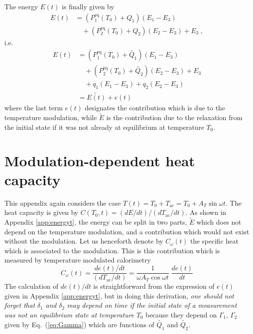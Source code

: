 \documentclass[pre,a4paper,twocolumn,superscriptaddress,%
floatfix]{revtex4}
\newcommand{\tac}{\ensuremath{T_{\mathrm{ac}}}}
\begin{document}
The energy $E(t)$ is finally given by
\begin{align}
  \label{eq:solutionEt}
  E(t) &= (P_1^{\mathrm{eq}}(T_0) + Q_1)(E_1 - E_3) \nonumber \\ & \quad +
  (P_2^{\mathrm{eq}}(T_0) + Q_2)(E_2 - E_3) + E_3 \; ,
\end{align}
i.e.
\begin{align}
  \label{eq:solutionEe}
  E(t) &= (P_1^{\mathrm{eq}}(T_0) + \widetilde{Q_1})(E_1 - E_3)
         \nonumber \\ & \quad
      +(P_2^{\mathrm{eq}}(T_0) + \widetilde{Q_2})(E_2 - E_3) + E_3 
  \nonumber \\                                                                 
  & \quad + q_1 (E_1 - E_3) + q_2 (E_2 - E_3)
    \nonumber \\
       &= \widetilde{E(t)} + e(t)
\end{align}
where the last term $e(t)$ designates the contribution which is due
to the temperature modulation, while $\widetilde{E}$ is the contribution due
to the relaxation from the initial state if it was not already at equilibrium
at temperature $T_0$.
\section{Modulation-dependent heat capacity}
\label{app:heatcapacity}

This appendix again considers the case $T(t) = T_0 + \tac = T_0 + A_T \sin
\omega t$.
The heat capacity is given by $C(T_0,t) = (dE/dt) / (d \tac / dt)$.
As shown in Appendix \ref{app:energyt}, the energy can be split in two parts,
$\widetilde{E}$ which does not depend on the temperature modulation, and a
contribution which would not exist without the modulation. Let us henceforth
denote by $C_{\omega}(t)$ the specific heat which is associated to the
modulation. This is this contribution which is measured by temperature modulated calorimetry
\begin{equation}
  \label{eq:comeg}
  C_{\omega}(t) = \frac{d e(t)/dt}{(d \tac / dt)} = \frac{1}{\omega A_T \cos
    \omega t} \; \frac{d e(t)}{dt}
\end{equation}
The calculation of ${d e(t)/dt}$ is straightforward from the expression of
$e(t)$ given in Appendix \ref{app:energyt}, but in doing this derivation,
{\em one
should not forget that $\delta_1$ and $\delta_2$  may depend on time if
  the initial state of a measurement was not an equilibrium state at
  temperature $T_0$} because they depend on $\Gamma_1$, $\Gamma_2$
given by Eq.~(\ref{eq:Gamma}) which are functions of $\widetilde{Q_1}$ and
$\widetilde{Q_2}$.
\end{document}
